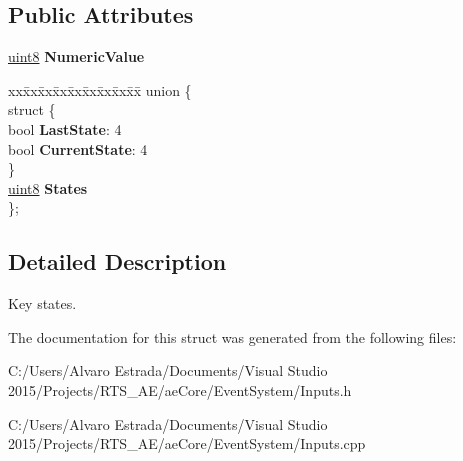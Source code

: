 \subsection*{Public Attributes}
\begin{DoxyCompactItemize}
\item 
\hyperlink{namespaceae_core_aa13093dc911869e5b24942552898f01f}{uint8} {\bfseries Numeric\+Value}\hypertarget{structae_core_1_1ae_key_states_a91d44cb75799c85e57d2c7d4c94200d7}{}\label{structae_core_1_1ae_key_states_a91d44cb75799c85e57d2c7d4c94200d7}

\item 
\begin{tabbing}
xx\=xx\=xx\=xx\=xx\=xx\=xx\=xx\=xx\=\kill
union \{\\
\>struct \{\\
\>\>bool {\bfseries LastState}: 4\\
\>\>bool {\bfseries CurrentState}: 4\\
\>\} \hypertarget{unionae_core_1_1ae_key_states_1_1_0D14_a792c84e5c96ef05ff375f99091560700}{}\label{unionae_core_1_1ae_key_states_1_1_0D14_a792c84e5c96ef05ff375f99091560700}
\\
\>\hyperlink{namespaceae_core_aa13093dc911869e5b24942552898f01f}{uint8} {\bfseries States}\\
\}; \hypertarget{structae_core_1_1ae_key_states_a27a20490b7d03febac29e69ed43a98d5}{}\label{structae_core_1_1ae_key_states_a27a20490b7d03febac29e69ed43a98d5}
\\

\end{tabbing}\end{DoxyCompactItemize}


\subsection{Detailed Description}
Key states. 

The documentation for this struct was generated from the following files\+:\begin{DoxyCompactItemize}
\item 
C\+:/\+Users/\+Alvaro Estrada/\+Documents/\+Visual Studio 2015/\+Projects/\+R\+T\+S\+\_\+\+A\+E/ae\+Core/\+Event\+System/Inputs.\+h\item 
C\+:/\+Users/\+Alvaro Estrada/\+Documents/\+Visual Studio 2015/\+Projects/\+R\+T\+S\+\_\+\+A\+E/ae\+Core/\+Event\+System/Inputs.\+cpp\end{DoxyCompactItemize}
